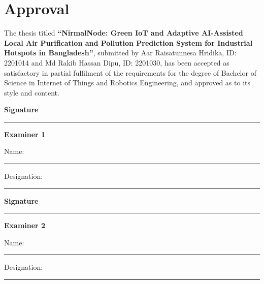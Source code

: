 \chapter*{Approval}

The thesis titled \textbf{``NirmalNode: Green IoT and Adaptive AI-Assisted Local Air Purification and Pollution Prediction System for Industrial Hotspots in Bangladesh''}, submitted by Aar Raisatunnesa Hridika, ID: 2201014 and Md Rakib Hassan Dipu, ID: 2201030, has been accepted as satisfactory in partial fulfilment of the requirements for the degree of Bachelor of Science in Internet of Things and Robotics Engineering, and approved as to its style and content.

\vspace{2.0cm}

\noindent
\begin{minipage}[t]{0.46\textwidth}
\textbf{Signature}
\vspace{0.8cm}

\hrule
\vspace{0.25cm}

\textbf{Examiner 1}

\vspace{0.25cm}

Name: \rule{3.2cm}{0.4pt}

\vspace{0.25cm}

Designation: \rule{2.7cm}{0.4pt}
\end{minipage}
\hfill
\begin{minipage}[t]{0.46\textwidth}
\textbf{Signature}
\vspace{0.8cm}

\hrule
\vspace{0.25cm}

\textbf{Examiner 2}

\vspace{0.25cm}

Name: \rule{3.2cm}{0.4pt}

\vspace{0.25cm}

Designation: \rule{2.7cm}{0.4pt}
\end{minipage}

\vspace{1.6cm}

